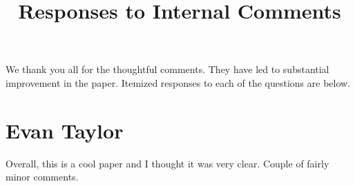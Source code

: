 

\usepackage[stable]{footmisc}

\newcommand*\leftright[2]{%
  \leavevmode
  \rlap{#1}%
  \hspace{0.5\linewidth}%
  #2}

\newcommand{\orth}{\ensuremath{\perp\!\!\!\perp}}%
\newcommand{\indep}{\orth}%
\newcommand{\notorth}{\ensuremath{\perp\!\!\!\!\!\!\diagup\!\!\!\!\!\!\perp}}%
\newcommand{\notindep}{\notorth}



\doublespacing



\singlespacing
\begin{titlepage}

\title{\Large \textbf{Responses to Internal Comments}}

\maketitle
\thispagestyle{empty}
\restoregeometry
\end{titlepage}

\doublespacing

\noindent We thank you all for the thoughtful comments. They have led to substantial improvement in the paper. Itemized responses to each of the questions are below.

\section*{Evan Taylor}

\noindent Overall, this is a cool paper and I thought it was very clear. Couple of fairly minor comments. 

